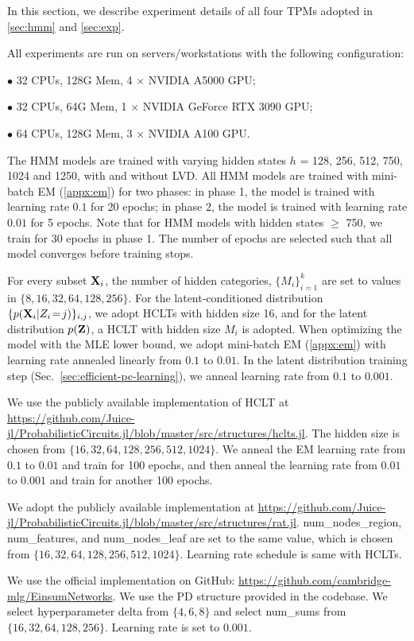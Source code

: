 \documentclass{article} %
\begin{document}
In this section, we describe experiment details of all four TPMs adopted in \cref{sec:hmm} and \cref{sec:exp}.

 All experiments are run on servers/workstations with the following configuration:

$\bullet$ 32 CPUs, 128G Mem, 4 $\times$ NVIDIA A5000 GPU;

$\bullet$ 32 CPUs, 64G Mem, 1 $\times$ NVIDIA GeForce RTX 3090 GPU;

$\bullet$ 64 CPUs, 128G Mem, 3 $\times$ NVIDIA A100 GPU.

The HMM models are trained with varying hidden states $h$ = 128, 256, 512, 750, 1024 and 1250, with and without LVD. All HMM models are trained with mini-batch EM (\cref{appx:em}) for two phases: in phase 1, the model is trained with learning rate $0.1$ for 20 epochs; in phase 2, the model is trained with learning rate $0.01$ for 5 epochs. Note that for HMM models with hidden states $\geq$ 750, we train for 30 epochs in phase 1. The number of epochs are selected such that all model converges before training stops.

 For every subset $\mathbf{X}_i$, the number of hidden categories, \ie $\{M_i\}_{i=1}^{k}$ are set to values in $\{8, 16, 32, 64, 128, 256\}$. For the latent-conditioned distribution $\{{p}(\mathbf{X}_i \vert Z_i \!=\! j)\}_{i,j}$, we adopt HCLTs with hidden size 16, and for the latent distribution ${p}(\mathbf{Z})$, a HCLT with hidden size $M_i$ is adopted. When optimizing the model with the MLE lower bound, we adopt mini-batch EM (\cref{appx:em}) with learning rate annealed linearly from $0.1$ to $0.01$. In the latent distribution training step (Sec.~\cref{sec:efficient-pc-learning}), we anneal learning rate from $0.1$ to $0.001$.

 We use the publicly available implementation of HCLT at \url{https://github.com/Juice-jl/ProbabilisticCircuits.jl/blob/master/src/structures/hclts.jl}. The hidden size is chosen from $\{16, 32, 64, 128, 256, 512, 1024\}$. We anneal the EM learning rate from $0.1$ to $0.01$ and train for 100 epochs, and then anneal the learning rate from $0.01$ to $0.001$ and train for another 100 epochs.

 We adopt the publicly available implementation at \url{https://github.com/Juice-jl/ProbabilisticCircuits.jl/blob/master/src/structures/rat.jl}. \textsf{num\_nodes\_region}, \textsf{num\_features}, and \textsf{num\_nodes\_leaf} are set to the same value, which is chosen from $\{16, 32, 64, 128, 256, 512, 1024\}$. Learning rate schedule is same with HCLTs.

 We use the official implementation on GitHub: \url{https://github.com/cambridge-mlg/EinsumNetworks}. We use the PD structure provided in the codebase. We select hyperparameter \textsf{delta} from $\{4, 6, 8\}$ and select \textsf{num\_sums} from $\{16, 32, 64, 128, 256\}$. Learning rate is set to $0.001$.
\end{document}

